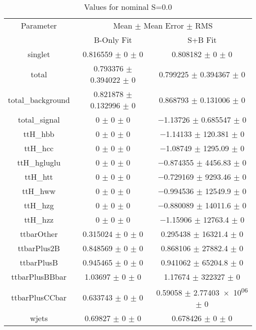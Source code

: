\begin{table}
\centering
\caption{Values for nominal S=0.0}
\begin{tabular}{ccc}
\toprule
Parameter & \multicolumn{2}{c}{Mean $\pm$ Mean Error $\pm$ RMS}\\
 & B-Only Fit & S+B Fit\\
\midrule
singlet & \num{0.816559} $\pm$ \num{0} $\pm$ \num{0} & \num{0.808182} $\pm$ \num{0} $\pm$ \num{0}\\
total & \num{0.793376} $\pm$ \num{0.394022} $\pm$ \num{0} & \num{0.799225} $\pm$ \num{0.394367} $\pm$ \num{0}\\
total\_background & \num{0.821878} $\pm$ \num{0.132996} $\pm$ \num{0} & \num{0.868793} $\pm$ \num{0.131006} $\pm$ \num{0}\\
total\_signal & \num{0} $\pm$ \num{0} $\pm$ \num{0} & \num{-1.13726} $\pm$ \num{0.685547} $\pm$ \num{0}\\
ttH\_hbb & \num{0} $\pm$ \num{0} $\pm$ \num{0} & \num{-1.14133} $\pm$ \num{120.381} $\pm$ \num{0}\\
ttH\_hcc & \num{0} $\pm$ \num{0} $\pm$ \num{0} & \num{-1.08749} $\pm$ \num{1295.09} $\pm$ \num{0}\\
ttH\_hgluglu & \num{0} $\pm$ \num{0} $\pm$ \num{0} & \num{-0.874355} $\pm$ \num{4456.83} $\pm$ \num{0}\\
ttH\_htt & \num{0} $\pm$ \num{0} $\pm$ \num{0} & \num{-0.729169} $\pm$ \num{9293.46} $\pm$ \num{0}\\
ttH\_hww & \num{0} $\pm$ \num{0} $\pm$ \num{0} & \num{-0.994536} $\pm$ \num{12549.9} $\pm$ \num{0}\\
ttH\_hzg & \num{0} $\pm$ \num{0} $\pm$ \num{0} & \num{-0.880089} $\pm$ \num{14011.6} $\pm$ \num{0}\\
ttH\_hzz & \num{0} $\pm$ \num{0} $\pm$ \num{0} & \num{-1.15906} $\pm$ \num{12763.4} $\pm$ \num{0}\\
ttbarOther & \num{0.315024} $\pm$ \num{0} $\pm$ \num{0} & \num{0.295438} $\pm$ \num{16321.4} $\pm$ \num{0}\\
ttbarPlus2B & \num{0.848569} $\pm$ \num{0} $\pm$ \num{0} & \num{0.868106} $\pm$ \num{27882.4} $\pm$ \num{0}\\
ttbarPlusB & \num{0.945465} $\pm$ \num{0} $\pm$ \num{0} & \num{0.941062} $\pm$ \num{65204.8} $\pm$ \num{0}\\
ttbarPlusBBbar & \num{1.03697} $\pm$ \num{0} $\pm$ \num{0} & \num{1.17674} $\pm$ \num{322327} $\pm$ \num{0}\\
ttbarPlusCCbar & \num{0.633743} $\pm$ \num{0} $\pm$ \num{0} & \num{0.59058} $\pm$ \num{2.77403e+06} $\pm$ \num{0}\\
wjets & \num{0.69827} $\pm$ \num{0} $\pm$ \num{0} & \num{0.678426} $\pm$ \num{0} $\pm$ \num{0}\\
\bottomrule
\end{tabular}
\end{table}